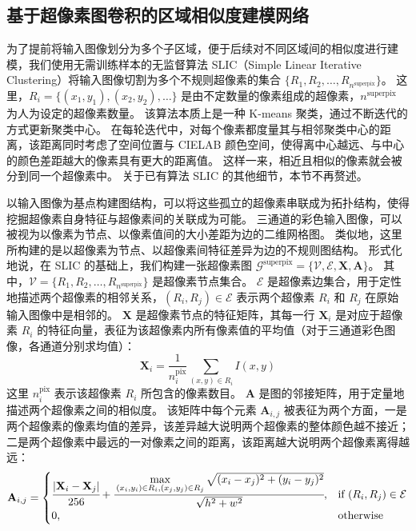 \subsection{基于超像素图卷积的区域相似度建模网络}
为了提前将输入图像划分为多个子区域，便于后续对不同区域间的相似度进行建模，我们使用无需训练样本的无监督算法 SLIC（Simple Linear Iterative Clustering）将输入图像切割为多个不规则超像素的集合 $\{ R_1, R_2, \dots, R_{n^\text{superpix}} \}$。
这里，$R_i = \{ (x_1,y_1), (x_2,y_2), \dots \}$ 是由不定数量的像素组成的超像素，$n^\text{superpix}$ 为人为设定的超像素数量\cite{}。
该算法本质上是一种 K-means 聚类\cite{}，通过不断迭代的方式更新聚类中心。
在每轮迭代中，对每个像素都度量其与相邻聚类中心的距离，该距离同时考虑了空间位置与 CIELAB 颜色空间，使得离中心越远、与中心的颜色差距越大的像素具有更大的距离值。
这样一来，相近且相似的像素就会被分到同一个超像素中。
关于已有算法 SLIC 的其他细节，本节不再赘述。
\par
以输入图像为基点构建图结构，可以将这些孤立的超像素串联成为拓扑结构，使得挖掘超像素自身特征与超像素间的关联成为可能。
三通道的彩色输入图像，可以被视为以像素为节点、以像素值间的大小差距为边的二维网格图。
类似地，这里所构建的是以超像素为节点、以超像素间特征差异为边的不规则图结构。
形式化地说，在 SLIC 的基础上，我们构建一张超像素图 $\mathcal{G}^\text{superpix} = \{ \mathcal{V}, \mathcal{E}, \mathbf{X}, \mathbf{A} \}$。
其中，$\mathcal{V} = \{ R_1, R_2, \dots, R_{n^\text{superpix}} \}$ 是超像素节点集合。
$\mathcal{E}$ 是超像素边集合，用于定性地描述两个超像素的相邻关系，$(R_i, R_j) \in \mathcal{E}$ 表示两个超像素 $R_i$ 和 $R_j$ 在原始输入图像中是相邻的。
$\mathbf{X}$ 是超像素节点的特征矩阵，其每一行 $\mathbf{X}_i$ 是对应于超像素 $R_i$ 的特征向量，表征为该超像素内所有像素值的平均值（对于三通道彩色图像，各通道分别求均值）：
\begin{equation}
\mathbf{X}_i = \frac{1}{n^\text{pix}_i} \sum_{(x,y) \in R_i} I(x,y) 
\end{equation}
这里 $n^\text{pix}_i$ 表示该超像素 $R_i$ 所包含的像素数目。
$\mathbf{A}$ 是图的邻接矩阵，用于定量地描述两个超像素之间的相似度。
该矩阵中每个元素 $\mathbf{A}_{i,j}$ 被表征为两个方面，一是两个超像素的像素均值的差异，该差异越大说明两个超像素的整体颜色越不接近；二是两个超像素中最远的一对像素之间的距离，该距离越大说明两个超像素离得越远：
\begin{equation}
\mathbf{A}_{i,j} =
\begin{cases}
    \cfrac{\vert \mathbf{X}_i - \mathbf{X}_j \vert}{256} + \cfrac{\max\limits_{(x_i,y_i) \in R_i,(x_j,y_j) \in R_j}\sqrt{(x_i - x_j)^2 + (y_i - y_j)^2}}{\sqrt{h^2 + w^2}},&\text{if } (R_i, R_j) \in \mathcal{E} \\
    0,&\text{otherwise}
\end{cases}
\end{equation}

